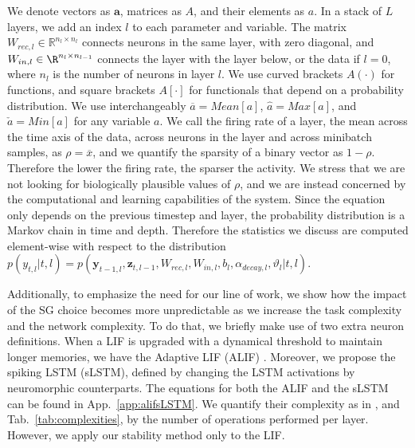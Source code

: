 We denote vectors as $\boldsymbol{a}$, matrices as $A$, and their elements as $a$.  In a stack of $L$ layers, we add an index $l$ to each parameter and variable. The matrix $W_{rec,l}\in\mathbb{R}^{n_{l}\times n_{l}} $ connects neurons in the same layer, with zero diagonal, and $W_{in,l}\in\R^{n_{l}\times n_{l-1}} $ connects the layer with the layer below, or the data if $l=0$, where $n_l$ is the number of neurons in layer $l$. We use curved brackets $A(\cdot)$ for functions, and square brackets $A[\cdot]$ for functionals that depend on a probability distribution. We use interchangeably $\overline{a} = Mean[a]$, $\hat{a}=Max[a]$, and $\check{a}=Min[a]$ for any variable $a$. We call the firing rate of a layer, the mean across the time axis of the data, across neurons in the layer and across minibatch samples, as $\rho=\overline{x}$, and we quantify the sparsity of a binary vector as $1-\rho$. Therefore the lower the firing rate, the sparser the activity. We stress that we are not looking for biologically plausible values of $\rho$, and we are instead concerned by the computational and learning capabilities of the system. 
Since the equation only depends on the previous timestep and layer, the probability distribution is a Markov chain in time and depth. Therefore the statistics we discuss are computed element-wise with respect to the distribution $p(y_{t,l}|t,l) = p( \boldsymbol{y}_{t-1, l},\boldsymbol{z}_{t,l-1},W_{rec,l}, W_{in,l},b_l, \alpha_{decay,l},\vartheta_l |t,l)$.

Additionally, to emphasize the need for our line of work, we show how the impact of the SG choice becomes more unpredictable as we increase the task complexity and the network complexity.
To do that, we briefly make use of two extra neuron definitions. When a LIF is upgraded with a dynamical threshold to maintain longer memories, we have the Adaptive LIF (ALIF) \cite{gerstner2014neuronal, lsnn}. Moreover, we propose the spiking LSTM (sLSTM), defined by changing the LSTM \cite{hochreiter1997long} activations by neuromorphic counterparts. The equations for both the ALIF and the sLSTM can be found in App.~\ref{app:alifsLSTM}. We quantify their complexity as in \cite{yin2021accurate}, and Tab.~\ref{tab:complexities}, by the number of operations performed per layer. However, we apply our stability method only to the LIF.

